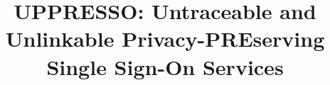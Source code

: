 \documentclass[letterpaper,twocolumn,10pt]{article}
\begin{document}
\date{}
\title{\Large \bf \textsf{UPPRESSO}: Untraceable and Unlinkable Privacy-PREserving\\Single Sign-On Services}


\end{document}
